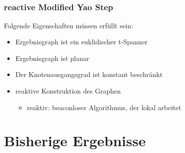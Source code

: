 \documentclass[compress]{beamer}
\begin{document}
\subsection{}
\begin{frame}
\frametitle{reactive Modified Yao Step}
Folgende Eigenschaften müssen erfüllt sein:
\begin{itemize}
  \item Ergebnisgraph ist ein euklidischer t-Spanner
  \item Ergebnisgraph ist planar
  \item Der Knotenausgangsgrad ist konstant beschränkt
  \item reaktive Konstruktion des Graphen
  \begin{itemize}
  	\item reaktiv: beaconloser Algorithmus, der lokal arbeitet
  \end{itemize}
  
\end{itemize}
\end{frame}



\section{Bisherige Ergebnisse}
\end{document}
